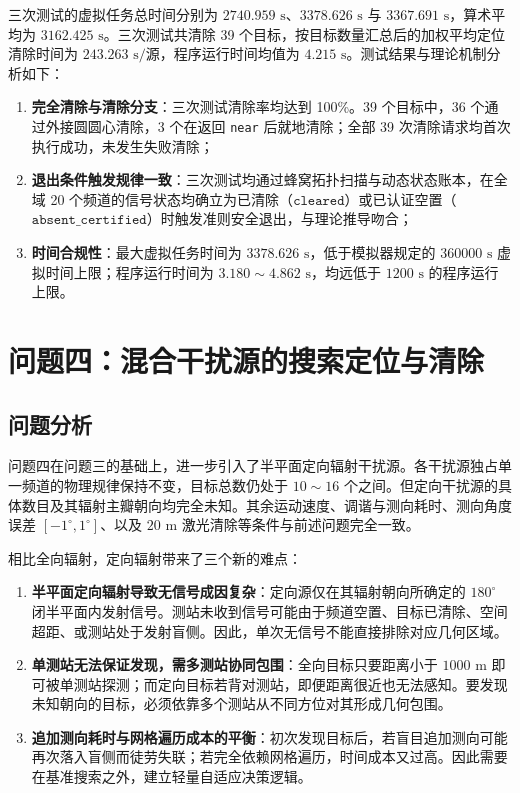 \documentclass[zihao=-4,a4paper,UTF8]{ctexart}
\begin{document}
三次测试的虚拟任务总时间分别为 $2740.959\text{ s}$、$3378.626\text{ s}$ 与 $3367.691\text{ s}$，算术平均为 $3162.425\text{ s}$。三次测试共清除 39 个目标，按目标数量汇总后的加权平均定位清除时间为 $243.263\text{ s/源}$，程序运行时间均值为 $4.215\text{ s}$。测试结果与理论机制分析如下：
\begin{enumerate}[leftmargin=2.5em, itemsep=0.05em, topsep=0.2em]
    \item \textbf{完全清除与清除分支}：三次测试清除率均达到 100\%。39 个目标中，36 个通过外接圆圆心清除，3 个在返回 \texttt{near} 后就地清除；全部 39 次清除请求均首次执行成功，未发生失败清除；
    \item \textbf{退出条件触发规律一致}：三次测试均通过蜂窝拓扑扫描与动态状态账本，在全域 20 个频道的信号状态均确立为已清除（$\texttt{cleared}$）或已认证空置（$\texttt{absent\_certified}$）时触发准则安全退出，与理论推导吻合；
    \item \textbf{时间合规性}：最大虚拟任务时间为 $3378.626\text{ s}$，低于模拟器规定的 $360000\text{ s}$ 虚拟时间上限；程序运行时间为 $3.180\sim4.862\text{ s}$，均远低于 $1200\text{ s}$ 的程序运行上限。
\end{enumerate}


\vspace{-0.4em}
\section{问题四：混合干扰源的搜索定位与清除}
\setlength{\abovedisplayskip}{3.5pt}
\setlength{\belowdisplayskip}{3.5pt}

\subsection{问题分析}

问题四在问题三的基础上，进一步引入了半平面定向辐射干扰源。各干扰源独占单一频道的物理规律保持不变，目标总数仍处于 $10\sim 16$ 个之间。但定向干扰源的具体数目及其辐射主瓣朝向均完全未知。其余运动速度、调谐与测向耗时、测向角度误差 $[-1^\circ, 1^\circ]$、以及 $20\text{ m}$ 激光清除等条件与前述问题完全一致。

相比全向辐射，定向辐射带来了三个新的难点：
\begin{enumerate}[leftmargin=2.2em, itemsep=0.04em, topsep=0.03em]
    \item \textbf{半平面定向辐射导致无信号成因复杂}：定向源仅在其辐射朝向所确定的 $180^\circ$ 闭半平面内发射信号。测站未收到信号可能由于频道空置、目标已清除、空间超距、或测站处于发射盲侧。因此，单次无信号不能直接排除对应几何区域。
    \item \textbf{单测站无法保证发现，需多测站协同包围}：全向目标只要距离小于 $1000\text{ m}$ 即可被单测站探测；而定向目标若背对测站，即便距离很近也无法感知。要发现未知朝向的目标，必须依靠多个测站从不同方位对其形成几何包围。
    \item \textbf{追加测向耗时与网格遍历成本的平衡}：初次发现目标后，若盲目追加测向可能再次落入盲侧而徒劳失联；若完全依赖网格遍历，时间成本又过高。因此需要在基准搜索之外，建立轻量自适应决策逻辑。
\end{enumerate}
\end{document}
